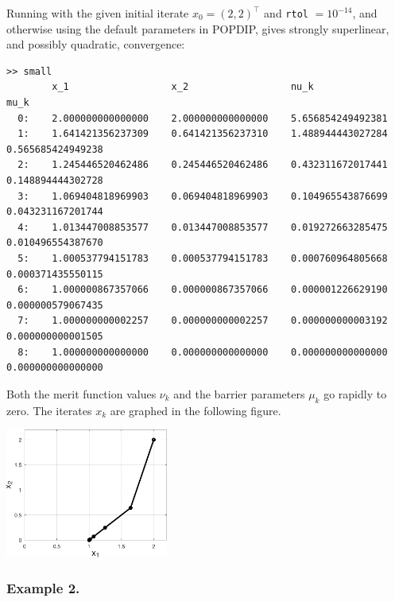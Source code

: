 \documentclass[11pt]{article}
\begin{document}
Running with the given initial iterate $x_0=(2,2)^\top$ and \texttt{rtol} $=10^{-14}$, and otherwise using the default parameters in POPDIP, gives strongly superlinear, and possibly quadratic, convergence:
\begin{Verbatim}[fontsize=\footnotesize]
>> small
        x_1                  x_2                  nu_k                 mu_k
  0:    2.000000000000000    2.000000000000000    5.656854249492381
  1:    1.641421356237309    0.641421356237310    1.488944443027284    0.565685424949238
  2:    1.245446520462486    0.245446520462486    0.432311672017441    0.148894444302728
  3:    1.069404818969903    0.069404818969903    0.104965543876699    0.043231167201744
  4:    1.013447008853577    0.013447008853577    0.019272663285475    0.010496554387670
  5:    1.000537794151783    0.000537794151783    0.000760964805668    0.000371435550115
  6:    1.000000867357066    0.000000867357066    0.000001226629190    0.000000579067435
  7:    1.000000000002257    0.000000000002257    0.000000000003192    0.000000000001505
  8:    1.000000000000000    0.000000000000000    0.000000000000000    0.000000000000000
\end{Verbatim}
Both the merit function values $\nu_k$ and the barrier parameters $\mu_k$ go rapidly to zero.  The iterates $x_k$ are graphed in the following figure.

\bigskip
\begin{center}
\includegraphics[width=0.4\textwidth]{figs/small.pdf}
\end{center}


\subsubsection*{Example 2.}
\end{document}

